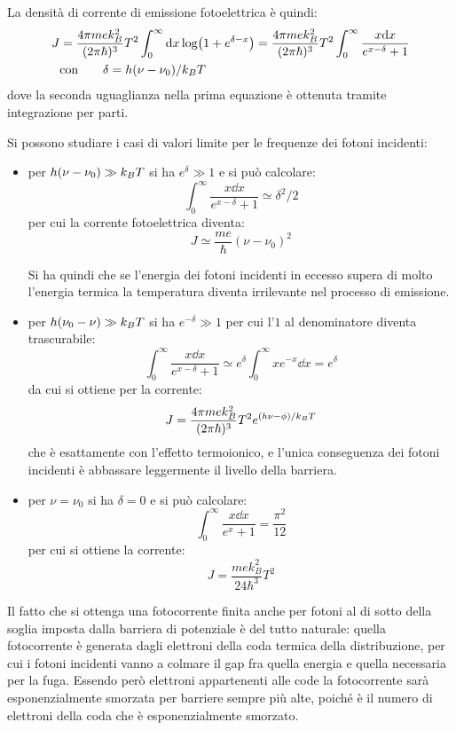 La densità di corrente di emissione fotoelettrica è quindi:
\begin{align*}
J &= \frac{4\pi m e k_B^2}{(2\pi \hbar)^3} T^2 \int_{0}^{\infty} \dd x \log( 1 + e^{\delta -x}) = \frac{4\pi m e k_B^2}{(2\pi \hbar)^3} T^2 \int_{0}^{\infty} \frac{x \dd x}{e^{x-\delta}+1} \\
&\text{con} \qquad \delta = h(\nu - \nu_0)/k_B T
\end{align*}
dove la seconda uguaglianza nella prima equazione è ottenuta tramite integrazione per parti.

Si possono studiare i casi di valori limite per le frequenze dei fotoni incidenti:
\begin{itemize}
	\item per $ h(\nu - \nu_0) \gg k_B T $ si ha $ e^\delta \gg 1 $ e si può calcolare:
		\[ \int_{0}^{\infty} \frac{x \dd x}{e^{x-\delta}+1} \simeq \delta^2/2 \]
		per cui la corrente fotoelettrica diventa:
		\[ J \simeq \frac{me}{\hbar} (\nu - \nu_0)^2\]
		
		Si ha quindi che se l'energia dei fotoni incidenti in eccesso supera di molto l'energia termica la temperatura diventa irrilevante nel processo di emissione.
	\item per $ h(\nu_0 - \nu) \gg k_B T $ si ha $ e^{-\delta} \gg 1 $ per cui l'$ 1 $ al denominatore diventa trascurabile:
		\[ \int_{0}^{\infty} \frac{x \dd x}{e^{x-\delta}+1} \simeq e^\delta \int_{0}^{\infty} x e^{-x} \dd x = e^\delta\]
		da cui si ottiene per la corrente:
		\[ J = \frac{4\pi m e k_B^2}{(2\pi \hbar)^3} T^2 e^{(h\nu - \phi)/k_B T}\]
		che è esattamente con l'effetto termoionico, e l'unica conseguenza dei fotoni incidenti è abbassare leggermente il livello della barriera.
	\item per $ \nu = \nu_0 $ si ha $ \delta = 0 $ e si può calcolare:
		\[ \int_{0}^{\infty} \frac{x \dd x}{e^{x}+1} = \frac{\pi^2}{12} \]
		per cui si ottiene la corrente:
		\[ J = \frac{m e k_B^2}{24 \hbar^3} T^2 \]
\end{itemize}

Il fatto che si ottenga una fotocorrente finita anche per fotoni al di sotto della soglia imposta dalla barriera di potenziale è del tutto naturale: quella fotocorrente è generata dagli elettroni della coda termica della distribuzione, per cui i fotoni incidenti vanno a colmare il gap fra quella energia e quella necessaria per la fuga.
Essendo però elettroni appartenenti alle code la fotocorrente sarà esponenzialmente smorzata per barriere sempre più alte, poiché è il numero di elettroni della coda che è esponenzialmente smorzato.

